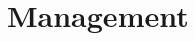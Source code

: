 \documentclass[ekobook.tex]{subfiles}
\begin{document}
\section{Management}
\newpage
\end{document}
